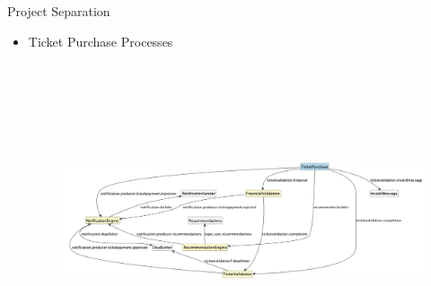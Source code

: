 \documentclass{beamer}
\begin{document}
\begin{frame}{Project Separation}
    \begin{itemize}
        \item Ticket Purchase Processes
        \begin{figure}[H]
            \centering
            \includegraphics[width=\textwidth, height=350px, keepaspectratio]{assets/uml/structure/Purchase.png}
        \end{figure}
    \end{itemize}
\end{frame}
\end{document}
